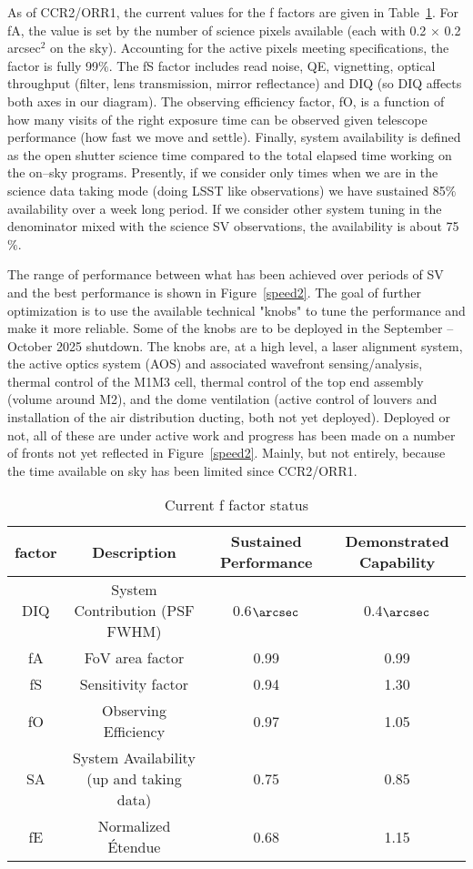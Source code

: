As of CCR2/ORR1, the current values for the f factors are given in Table~\ref{tab:factors}. For fA, the value is set by the number of science pixels available (each with 0.2 $\times$ 0.2 arcsec$^2$ on the sky). Accounting for the active pixels meeting specifications, the factor is fully 99$\%$. The fS factor includes read noise, QE, vignetting, optical throughput (filter, lens transmission, mirror reflectance) and DIQ (so DIQ affects both axes in our diagram). The observing efficiency factor, fO, is a function of how many visits of the right exposure time can be observed given telescope performance (how fast we move and settle). Finally, system availability is defined as the open shutter science time compared to the total elapsed time working on the on--sky programs. Presently, if we consider only times when we are in the science data taking mode (doing LSST like observations) we have sustained 85$\%$ availability over a week long period. If we consider other system tuning in the denominator mixed with the science SV observations, the availability is about 75$\%$. 

The range of performance between what has been achieved over periods of SV and the best performance is shown in Figure~\ref{speed2}. The goal of further optimization is to use the available technical "knobs" to tune the performance and make it more reliable. Some of the knobs are to be deployed in the September -- October 2025 shutdown. The knobs are, at a high level, a laser alignment system, the active optics system (AOS) and associated wavefront sensing/analysis, thermal control of the M1M3 cell, thermal control of the top end assembly (volume around M2), and the dome ventilation (active control of louvers and installation of the air distribution ducting, both not yet deployed). Deployed or not, all of these are under active work and progress has been made on a number of fronts not yet reflected in Figure~\ref{speed2}. Mainly, but not entirely,  because the time available on sky has been limited since CCR2/ORR1. 

\begin{table}[]
\renewcommand{\arraystretch}{2}
\small
\centering
\caption{Current f factor status}\label{tab:factors}
\begin{tabular}{cccc}
\hline
factor & Description& Sustained Performance & Demonstrated Capability \\
\hline \hline
DIQ & System Contribution (PSF FWHM)  & 0.6$\arcsec$ & 0.4$\arcsec$ \\
fA & FoV area factor & 0.99 & 0.99 \\
fS & Sensitivity factor & 0.94 & 1.30 \\
fO & Observing Efficiency & 0.97 & 1.05 \\
SA & System Availability (up and taking data) & 0.75 & 0.85 \\
fE & Normalized \'{E}tendue & 0.68 & 1.15 \\

\hline
\end{tabular}
\end{table}

